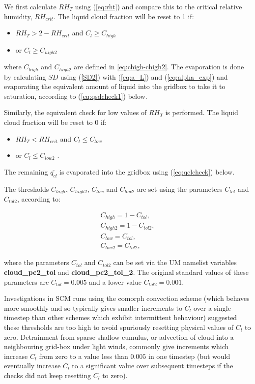 \documentclass{UMDP_article}
\begin{document}
We first calculate $RH_T$ using (\ref{eq:rht}) and compare
this to the critical relative humidity, $RH_{crit}$. The liquid
cloud fraction will be reset to 1 if:
\begin{itemize}
\item{ $RH_T > 2 - RH_{crit}$ and $C_l \ge C_{high}$}
\item{ or $C_l \ge C_{high 2}$ } 
\end{itemize}
where $C_{high}$ and $C_{high 2}$ are defined in \ref{eq:chigh-chigh2}.
The evaporation is done by calculating $SD$ using (\ref{SD2}) with (\ref{eq:a_L}) and
(\ref{eq:alpha_exp}) and evaporating the equivalent amount of liquid
into the gridbox to take it to saturation, according to
(\ref{eq:qsdcheck1}) below.

Similarly, the equivalent check for low values of $RH_T$ is performed.
The liquid
cloud fraction will be reset to 0 if:
\begin{itemize}
\item{ $RH_T < RH_{crit}$ and $C_l \le C_{low}$}
\item{ or $C_l \le C_{low 2}$ .}
\end{itemize}
The remaining $\overline{q_{cl}}$ is evaporated into the gridbox
using (\ref{eq:qclcheck}) below.

The thresholds $C_{high}$, $C_{high 2}$, $C_{low}$ and $C_{low 2}$ are
set using the parameters $C_{tol}$ and $C_{tol 2}$, according to:

\begin{eqnarray}
C_{high} = 1 - C_{tol},  \nonumber \\
C_{high 2} = 1 - C_{tol 2},  \nonumber \\
C_{low} = C_{tol},  \nonumber \\
C_{low 2} =  C_{tol 2},
\label{eq:chigh-chigh2}
\end{eqnarray}

where the parameters $C_{tol}$ and $C_{tol 2}$ can be set via the UM namelist
variables {\bf cloud\_pc2\_tol} and {\bf cloud\_pc2\_tol\_2}.
The original standard values of these parameters are
$C_{tol} = 0.005$ and a lower value $C_{tol 2} = 0.001$.

Investigations in SCM runs using the comorph convection scheme
(which behaves more smoothly and so typically gives smaller increments
to $C_l$ over a single timestep than other schemes which exhibit intermittent
behaviour) suggested these thresholds are too high to avoid spuriously
resetting physical values of $C_l$ to zero.  Detrainment from sparse
shallow cumulus, or advection of cloud into a neighbouring grid-box
under light winds, commonly give increments which increase $C_l$ from zero
to a value less than $0.005$ in one timestep (but would eventually increase
$C_l$ to a significant value over subsequent timesteps if the checks did
not keep resetting $C_l$ to zero).
\end{document}
